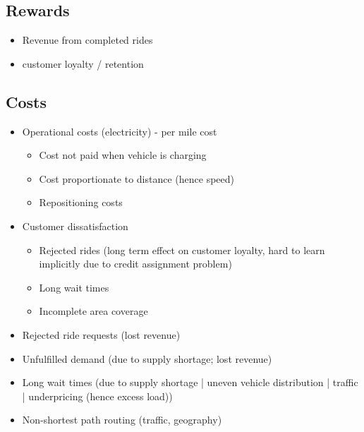 \documentclass[12pt]{article}
\begin{document}
\subsection*{Rewards}
\begin{itemize}
		\item Revenue from completed rides
		\item {} customer loyalty / retention
\end{itemize}
\subsection*{Costs}
\begin{itemize}
		\item Operational costs (electricity) - per mile cost
				\begin{itemize}
						\item Cost not paid when vehicle is charging
						\item Cost proportionate to distance (hence speed)
						\item Repositioning costs
				\end{itemize}
		\item Customer dissatisfaction
				\begin{itemize}
						\item Rejected rides (long term effect on customer loyalty, hard to learn
								implicitly due to credit assignment problem)
						\item Long wait times
						\item Incomplete area coverage
				\end{itemize}
\end{itemize}
\begin{itemize}
		\item Rejected ride requests (lost revenue)
		\item Unfulfilled demand (due to supply shortage; lost revenue)
		\item Long wait times (due to supply shortage | uneven vehicle distribution | traffic |
				underpricing (hence excess load))
		\item Non-shortest path routing (traffic, geography)
\end{itemize}

\newpage
\end{document}
